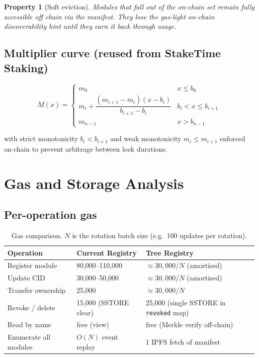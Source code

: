 \documentclass[11pt,a4paper]{article}
\newtheorem{property}{Property}[section]
\begin{document}
\begin{property}[Soft eviction]
Modules that fall out of the on-chain set remain fully accessible off chain via the manifest. They lose the gas-light on-chain discoverability hint until they earn it back through usage.
\end{property}

\subsection{Multiplier curve (reused from StakeTime Staking)}

\begin{equation}
M(x) = \begin{cases}
m_0 & x \leq b_0 \\[4pt]
m_i + \dfrac{(m_{i+1} - m_i)(x - b_i)}{b_{i+1} - b_i} & b_i < x \leq b_{i+1} \\[6pt]
m_{n-1} & x > b_{n-1}
\end{cases}
\label{eq:multiplier-ref}
\end{equation}

with strict monotonicity $b_i < b_{i+1}$ and weak monotonicity $m_i \leq m_{i+1}$ enforced on-chain to prevent arbitrage between lock durations.

\section{Gas and Storage Analysis}

\subsection{Per-operation gas}

\begin{table}[H]
\centering
\begin{tabularx}{\textwidth}{lXX}
\toprule
\textbf{Operation} & \textbf{Current Registry} & \textbf{Tree Registry} \\
\midrule
Register module          & 80{,}000--110{,}000 & $\approx 30{,}000 / N$ (amortised) \\
Update CID               & 30{,}000--50{,}000 & $\approx 30{,}000 / N$ (amortised) \\
Transfer ownership       & 25{,}000 & $\approx 30{,}000 / N$ \\
Revoke / delete          & 15{,}000 (SSTORE clear) & 25{,}000 (single SSTORE in \texttt{revoked} map) \\
Read by name             & free (view) & free (Merkle verify off-chain) \\
Enumerate all modules    & $O(N)$ event replay & 1 IPFS fetch of manifest \\
\bottomrule
\end{tabularx}
\caption{Gas comparison. $N$ is the rotation batch size (e.g.\ 100 updates per rotation).}
\end{table}
\end{document}
